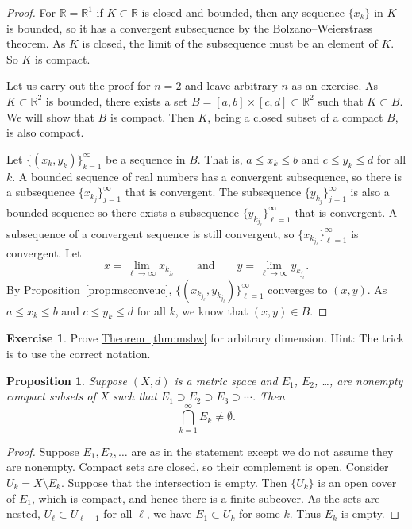 \documentclass[12pt,openany]{book}
\newcommand{\R}{{\mathbb{R}}}
\theoremstyle{plain}
\newtheorem{prop}[thm]{Proposition}
\theoremstyle{remark}
\theoremstyle{definition}
\newenvironment{exbox}{%
    \def\FrameCommand{\vrule width 1pt \relax\hspace{10pt}}%
    \MakeFramed{\advance\hsize-\width\FrameRestore}%
}{%
    \endMakeFramed
}
\theoremstyle{exercise}
\newtheorem{exercise}{Exercise}[section]
\theoremstyle{example}
\newcommand{\thmref}[1]{\hyperref[#1]{Theorem~\ref*{#1}}}
\newcommand{\propref}[1]{\hyperref[#1]{Proposition~\ref*{#1}}}
\begin{document}
\begin{proof}
For $\R = \R^1$ if $K \subset \R$ is closed and bounded, then
any sequence $\{ x_k \}$ in $K$ is bounded, so it has a convergent
subsequence by
the Bolzano--Weierstrass theorem.
As $K$ is closed, the limit of the subsequence must be an element of
$K$.  So $K$ is compact.

Let us carry out the proof for $n=2$ and leave arbitrary $n$ as an exercise.
As $K \subset \R^2$ is bounded, there exists a set
$B=[a,b]\times[c,d] \subset \R^2$ such that $K \subset B$.  We will show
that $B$ is compact.  Then $K$, being a closed subset of a compact $B$, is
also compact.  

Let $\bigl\{ (x_k,y_k) \bigr\}_{k=1}^\infty$ be a sequence in $B$.  That is,
$a \leq x_k \leq b$ and
$c \leq y_k \leq d$ for all $k$.  A bounded sequence of real numbers
has a convergent
subsequence, so there is a subsequence $\{ x_{k_j} \}_{j=1}^\infty$
that is convergent.  The subsequence 
$\{ y_{k_j} \}_{j=1}^\infty$ is also a bounded sequence so there exists
a subsequence
$\{ y_{k_{j_\ell}} \}_{\ell=1}^\infty$ that is convergent.  A subsequence of a
convergent sequence is still convergent, so 
$\{ x_{k_{j_\ell}} \}_{\ell=1}^\infty$ is convergent.
Let
\begin{equation*}
x = \lim_{\ell\to\infty} x_{k_{j_\ell}}
\qquad \text{and} \qquad
y = \lim_{\ell\to\infty} y_{k_{j_\ell}} .
\end{equation*}
By \propref{prop:msconveuc},
$\bigl\{ (x_{k_{j_\ell}},y_{k_{j_\ell}}) \bigr\}_{\ell=1}^\infty$ converges to $(x,y)$.
As $a \leq x_k \leq b$ and
$c \leq y_k \leq d$ for all $k$, we know that $(x,y) \in B$.
\end{proof}

\begin{exbox}
\begin{exercise}
Prove \thmref{thm:msbw} for arbitrary dimension.
Hint: The trick is to use the correct notation.
\end{exercise}
\end{exbox}

\begin{prop}
Suppose $(X,d)$ is a metric space
and $E_1$, $E_2$, \ldots, are
nonempty compact subsets of $X$ such that
$E_1 \supset E_2 \supset E_3 \supset \cdots$.  Then
\begin{equation*}
\bigcap_{k=1}^\infty E_k \neq \emptyset .
\end{equation*}
\end{prop}

\begin{proof}
Suppose $E_1,E_2,\ldots$ are as in the statement except we do not
assume they are nonempty.
Compact sets are closed, so their complement is open.  Consider
$U_k = X \setminus E_k$.  Suppose that the intersection is empty.
Then $\{ U_k \}$ is an open cover of $E_1$, which is compact,
and hence there is a finite subcover.
As the sets are nested,
$U_\ell \subset U_{\ell+1}$ for all $\ell$,
we have $E_1 \subset U_k$ for some $k$.   Thus $E_k$ is empty.
\end{proof}
\end{document}
